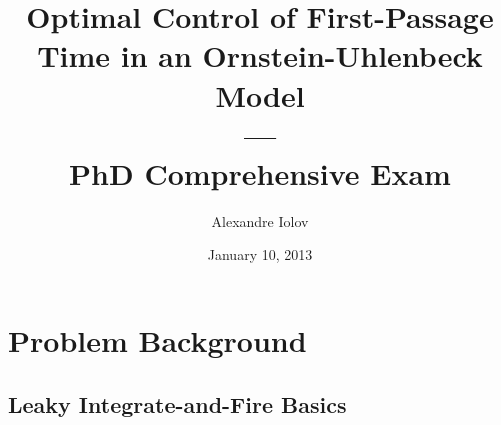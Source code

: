 \documentclass{beamer}
\title[Spike-Control for Neurons]{Optimal Control of First-Passage Time
in an Ornstein-Uhlenbeck Model
\\
---
\\
PhD Comprehensive Exam }
\author{Alexandre Iolov}
\institute{University of Ottawa}
\date{January 10, 2013}
\begin{document}
\begin{frame}
\titlepage
\end{frame}

\begin{frame}
\tableofcontents[pausesections]
\end{frame}

\section{Problem Background}
\subsection[LIFs]{Leaky Integrate-and-Fire Basics}
\end{document}
